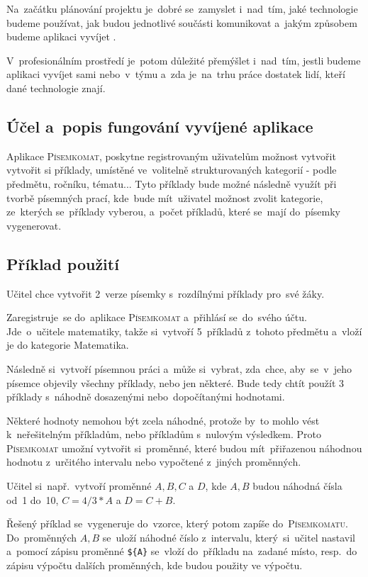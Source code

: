 \documentclass[14pt,a4paper]{article}
\begin{document}
        Na~začátku plánování projektu je~dobré se~zamyslet i~nad~tím, jaké technologie budeme používat, jak budou jednotlivé součásti komunikovat a~jakým způsobem budeme aplikaci vyvíjet \parencite{bctynovsky:specifikacepozadavku}.
    
        V~profesionálním prostředí je~potom důležité přemýšlet i~nad~tím, jestli budeme aplikaci vyvíjet sami nebo~v~týmu a~zda je~na~trhu práce dostatek lidí, kteří dané technologie znají.

        \subsection{Účel a~popis fungování vyvíjené aplikace}
        Aplikace \textsc{Písemkomat}, poskytne registrovaným uživatelům možnost vytvořit vytvořit si příklady, umístěné ve~volitelně
        strukturovaných kategorií - podle předmětu, ročníku, tématu... Tyto příklady bude možné následně využít při tvorbě písemných prací,
        kde~bude mít~uživatel možnost zvolit kategorie, ze~kterých se~příklady vyberou, a~počet příkladů, které se~mají do~písemky vygenerovat. 
        \subsection{Příklad použití}
        Učitel chce vytvořit 2~verze písemky s~rozdílnými příklady pro~své žáky.
        
        Zaregistruje~se do~aplikace \textsc{Písemkomat} a~přihlásí se~do~svého účtu. Jde~o~učitele matematiky, takže si~vytvoří 5~příkladů z~tohoto předmětu a~vloží je do kategorie Matematika.

        Následně si~vytvoří písemnou práci a~může si~vybrat, zda~chce, aby~se~v~jeho písemce objevily všechny příklady, nebo jen některé. Bude tedy chtít použít 3\,příklady s~náhodně dosazenými nebo~dopočítanými hodnotami.
        
        Některé hodnoty nemohou být zcela náhodné, protože by~to mohlo vést k~neřešitelným příkladům, nebo příkladům s~nulovým výsledkem.
        Proto \textsc{Písemkomat} umožní vytvořit si~proměnné, které budou mít~přiřazenou náhodnou hodnotu z~určitého intervalu nebo vypočtené z~jiných proměnných.

        Učitel si~např.~vytvoří proměnné $A, B, C$ a $D$, kde $A, B$ budou náhodná čísla od~1 do~10, $C = 4/3*A$ a $D = C + B$.

        Řešený příklad se~vygeneruje do~vzorce, který potom zapíše do~\textsc{Písemkomatu}. Do~proměnných $A, B$ se~uloží náhodné číslo z~intervalu, který~si~učitel nastavil a~pomocí zápisu proměnné \texttt{\$\{A\}} se~vloží do~příkladu na~zadané místo, resp.~do zápisu výpočtu dalších proměnných, kde budou použity ve výpočtu.
        
\end{document}

